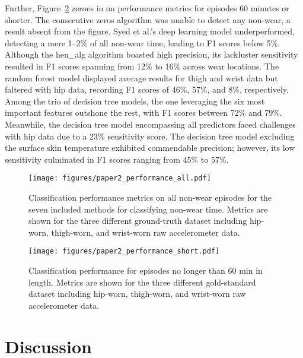 \documentclass[
  10pt,
]{scrbook}
\begin{document}
Further, Figure~\ref{fig-paper2_performance_short} zeroes in on
performance metrics for episodes 60 minutes or shorter. The consecutive
zeros algorithm was unable to detect any non-wear, a result absent from
the figure. Syed et al.'s deep learning model underperformed, detecting
a mere 1--2\% of all non-wear time, leading to F1 scores below 5\%.
Although the heu\_alg algorithm boasted high precision, its lackluster
sensitivity resulted in F1 scores spanning from 12\% to 16\% across wear
locations. The random forest model displayed average results for thigh
and wrist data but faltered with hip data, recording F1 scores of 46\%,
57\%, and 8\%, respectively. Among the trio of decision tree models, the
one leveraging the six most important features outshone the rest, with
F1 scores between 72\% and 79\%. Meanwhile, the decision tree model
encompassing all predictors faced challenges with hip data due to a 23\%
sensitivity score. The decision tree model excluding the surface skin
temperature exhibited commendable precision; however, its low
sensitivity culminated in F1 scores ranging from 45\% to 57\%.

\begin{figure}

{\centering \texttt{[image: figures/paper2\_performance\_all.pdf]}

}

\caption{\label{fig-paper2_performance_all}Classification performance
metrics on all non-wear episodes for the seven included methods for
classifying non-wear time. Metrics are shown for the three different
ground-truth dataset including hip-worn, thigh-worn, and wrist-worn raw
accelerometer data.}

\end{figure}

\begin{figure}

{\centering \texttt{[image: figures/paper2\_performance\_short.pdf]}

}

\caption{\label{fig-paper2_performance_short}Classification performance
for episodes no longer than 60 min in length. Metrics are shown for the
three different gold-standard dataset including hip-worn, thigh-worn,
and wrist-worn raw accelerometer data.}

\end{figure}

\hypertarget{discussion-1}{%
\section{Discussion}\label{discussion-1}}
\end{document}
